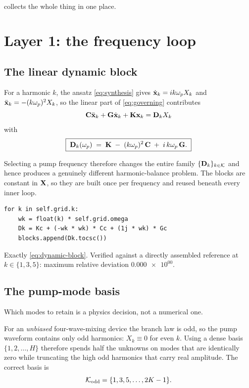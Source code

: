  collects the whole thing in one place.

\section{Layer 1: the frequency loop}
\label{sec:freq-loop}

\subsection{The linear dynamic block}

For a harmonic $k$, the ansatz \eqref{eq:synthesis} gives
$\dot{\mathbf{x}}_k = ik\omega_{p} X_k$ and $\ddot{\mathbf{x}}_k = -(k\omega_{p})^{2}X_k$, so the linear
part of \eqref{eq:governing} contributes
\begin{equation}
  \mathbf{C}\ddot{\mathbf{x}}_k + \mathbf{G}\dot{\mathbf{x}}_k + \mathbf{K}\mathbf{x}_k
  = \mathbf{D}_k X_k
\end{equation}
with
\begin{equation}
  \boxed{\;
  \mathbf{D}_k(\omega_{p}) \;=\; \mathbf{K} \;-\; (k\omega_{p})^{2}\,\mathbf{C} \;+\; i\,k\omega_{p}\,\mathbf{G} .
  \;}
  \label{eq:dynamic-block}
\end{equation}

Selecting a pump frequency therefore changes the entire family
$\{\mathbf{D}_k\}_{k\in\mathcal{K}}$ and hence produces a genuinely different
harmonic-balance problem. The blocks are constant in $\mathbf{X}$, so they are built
once per frequency and reused beneath every inner loop.

\begin{implnote}
\begin{lstlisting}
for k in self.grid.k:
    wk = float(k) * self.grid.omega
    Dk = Kc + (-wk * wk) * Cc + (1j * wk) * Gc
    blocks.append(Dk.tocsc())
\end{lstlisting}
Exactly \eqref{eq:dynamic-block}. Verified against a directly assembled
reference at $k\in\{1,3,5\}$: maximum relative deviation
$\num{0.000e+00}$.
\end{implnote}

\subsection{The pump-mode basis}
\label{sec:pump-basis}

Which modes to retain is a physics decision, not a numerical one.

For an \emph{unbiased} four-wave-mixing device the branch law is odd, so the
pump waveform contains only odd harmonics: $X_k \equiv 0$ for even $k$. Using a
dense basis $\{1,2,\dots,H\}$ therefore spends half the unknowns on modes that
are identically zero while truncating the high odd harmonics that carry real
amplitude. The correct basis is
\begin{equation}
  \mathcal{K}_{\mathrm{odd}} = \{1,3,5,\dots,2K-1\}.
\end{equation}


